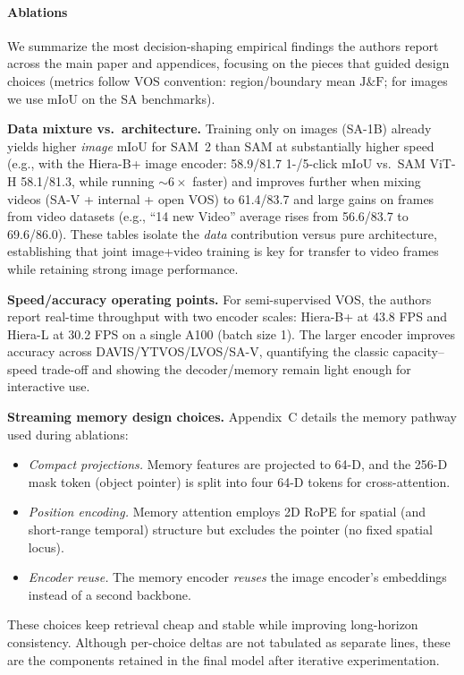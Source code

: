 \begin{enrichment}
\begin{enrichment}
		\newpage
		
		\paragraph{Ablations}
		We summarize the most decision-shaping empirical findings the authors report across the main paper and appendices, focusing on the pieces that guided design choices (metrics follow VOS convention: region/boundary mean $\text{J\&F}$; for images we use mIoU on the SA benchmarks).
		
		\textbf{Data mixture vs.\ architecture.} Training only on images (SA-1B) already yields higher \emph{image} mIoU for SAM~2 than SAM at substantially higher speed (e.g., with the Hiera-B+ image encoder: 58.9/81.7 1-/5-click mIoU vs.\ SAM ViT-H 58.1/81.3, while running $\sim6\times$ faster) and improves further when mixing videos (SA-V + internal + open VOS) to 61.4/83.7 and large gains on frames from video datasets (e.g., “14 new Video” average rises from 56.6/83.7 to 69.6/86.0). These tables isolate the \emph{data} contribution versus pure architecture, establishing that joint image+video training is key for transfer to video frames while retaining strong image performance.
		
		\textbf{Speed/accuracy operating points.} For semi-supervised VOS, the authors report real-time throughput with two encoder scales: Hiera-B+ at 43.8 FPS and Hiera-L at 30.2 FPS on a single A100 (batch size 1). The larger encoder improves accuracy across DAVIS/YTVOS/LVOS/SA-V, quantifying the classic capacity–speed trade-off and showing the decoder/memory remain light enough for interactive use.
		
		\textbf{Streaming memory design choices.}
		Appendix~C details the memory pathway used during ablations:
		\begin{itemize}
			\item \emph{Compact projections.} Memory features are projected to 64-D, and the 256-D mask token (object pointer) is split into four 64-D tokens for cross-attention.
			\item \emph{Position encoding.} Memory attention employs 2D RoPE for spatial (and short-range temporal) structure but excludes the pointer (no fixed spatial locus).
			\item \emph{Encoder reuse.} The memory encoder \emph{reuses} the image encoder’s embeddings instead of a second backbone.
		\end{itemize}
		These choices keep retrieval cheap and stable while improving long-horizon consistency. Although per-choice deltas are not tabulated as separate lines, these are the components retained in the final model after iterative experimentation.
		

\end{enrichment}
\end{enrichment}
